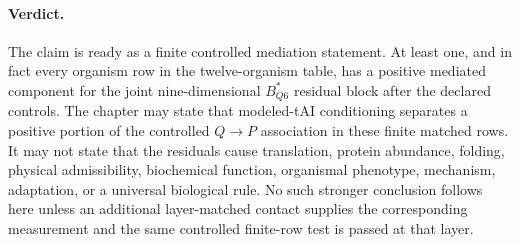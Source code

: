 \paragraph{Verdict.}
The claim is ready as a finite controlled mediation statement.  At least one, and in fact every organism row in the twelve-organism table, has a positive mediated component for the joint nine-dimensional $B^{\ast}_{Q6}$ residual block after the declared controls.  The chapter may state that modeled-tAI conditioning separates a positive portion of the controlled $Q\to P$ association in these finite matched rows.  It may not state that the residuals cause translation, protein abundance, folding, physical admissibility, biochemical function, organismal phenotype, mechanism, adaptation, or a universal biological rule.  No such stronger conclusion follows here unless an additional layer-matched contact supplies the corresponding measurement and the same controlled finite-row test is passed at that layer.
